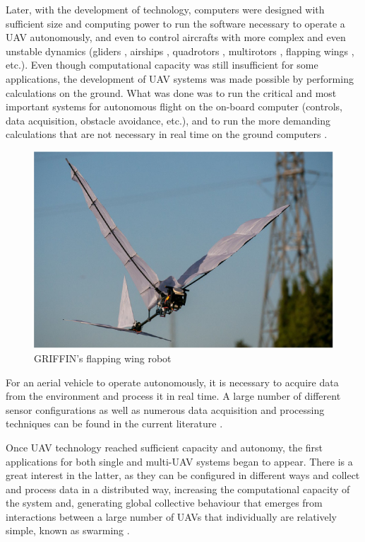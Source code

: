 Later, with the development of technology, computers were designed with sufficient size and computing power to run the software necessary to operate a \gls{UAV} autonomously, and even to control aircrafts with more complex and even unstable dynamics (gliders \cite{predator, BIGBLUE}, airships \cite{AURORA}, quadrotors \cite{quadrotorsreview, mesicopter, pounds, miniquadrotor}, multirotors \cite{fullyactuated}, flapping wings \cite{COLIBRI, GRIFFING, GRIFFIN2021}, etc.). Even though computational capacity was still insufficient for some applications, the development of \gls{UAV} systems was made possible by performing calculations on the ground. What was done was to run the critical and most important systems for autonomous flight on the on-board computer (controls, data acquisition, obstacle avoidance, etc.), and to run the more demanding calculations that are not necessary in real time on the ground computers \cite{OffBoard}.

\begin{figure}[htbp]
    \centering
    \includegraphics[width=0.6\linewidth]
    {Preliminaries/figures/GRIFFIN.png}
    \caption{GRIFFIN's flapping wing robot \cite{GRIFFIN2021}}
    \label{fig:griffin}
\end{figure}

For an aerial vehicle to operate autonomously, it is necessary to acquire data from the environment and process it in real time. A large number of different sensor configurations as well as numerous data acquisition and processing techniques can be found in the current literature \cite{SenseAndAvoid, aasen2018quantitative, miningSensors}.

Once UAV technology reached sufficient capacity and autonomy, the first applications for both single \cite{nex2014uav, radoglou2020compilation, drummond2015uav} and multi-\gls{UAV} \cite{martinez2007multi, gu2018multiple, scherer2015autonomous} systems began to appear. There is a great interest in the latter, as they can be configured in different ways \cite{multiUAVclassification} and collect and process data in a distributed way, increasing the computational capacity of the system \cite{pascarella2015parallel, guo2021coded} and, generating global collective behaviour that emerges from interactions between a large number of \glspl{UAV} that individually are relatively simple, known as swarming \cite{zhou2020uav, campion2018uav, chen2020sidr}. 

